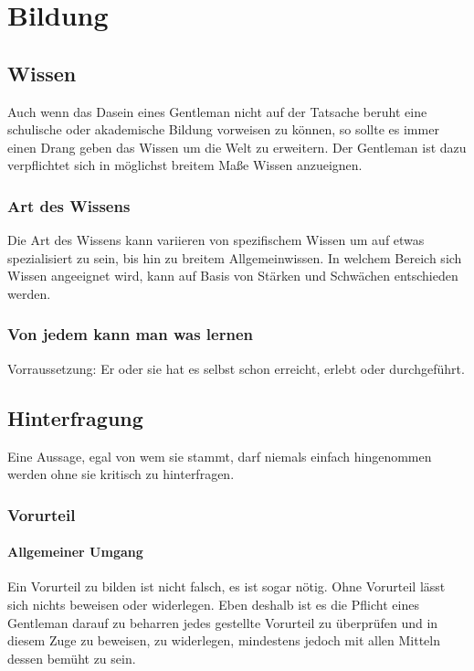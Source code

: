 \chapter{Bildung}

    \section{Wissen}
        Auch wenn das Dasein eines Gentleman nicht auf der Tatsache beruht eine schulische oder akademische Bildung vorweisen zu können, so sollte es immer einen Drang geben das Wissen um die Welt zu erweitern. Der Gentleman ist dazu verpflichtet sich in möglichst breitem Maße Wissen anzueignen.
        
        \subsection{Art des Wissens} 
            Die Art des Wissens kann variieren von spezifischem Wissen um auf etwas spezialisiert zu sein, bis hin zu breitem Allgemeinwissen. In welchem Bereich sich Wissen angeeignet wird, kann auf Basis von Stärken und Schwächen entschieden werden.    
        
        \subsection{Von jedem kann man was lernen}
            Vorraussetzung: Er oder sie hat es selbst schon erreicht, erlebt oder durchgeführt.

    \section{Hinterfragung}
    \label{sec:hinterfragung}
        Eine Aussage, egal von wem sie stammt, darf niemals einfach hingenommen werden ohne sie kritisch zu hinterfragen.

        \subsection{Vorurteil}
            \subsubsection{Allgemeiner Umgang}
                Ein Vorurteil zu bilden ist nicht falsch, es ist sogar nötig. Ohne Vorurteil lässt sich nichts beweisen oder widerlegen. 
                Eben deshalb ist es die Pflicht eines Gentleman darauf zu beharren jedes gestellte Vorurteil zu überprüfen und in diesem Zuge zu beweisen, 
                zu widerlegen, mindestens jedoch mit allen Mitteln dessen bemüht zu sein.

